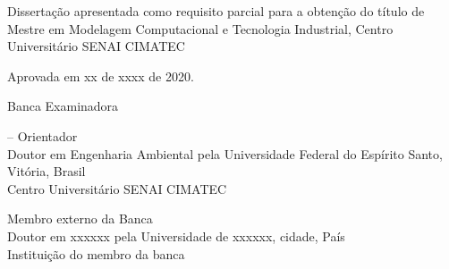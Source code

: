 \begin{folhadeaprovacao}

  \begin{center}
    {\ABNTEXchapterfont\large\imprimirautor}

    \vspace*{\fill}\vspace*{\fill}
    \begin{center}
      \ABNTEXchapterfont\large\imprimirtitulo
    \end{center}
    \vspace*{\fill}
    
    \hspace{\textwidth}
    \begin{minipage}{\textwidth}
       Dissertação apresentada como requisito parcial para a obtenção do título de Mestre em Modelagem Computacional e Tecnologia Industrial, Centro Universitário SENAI CIMATEC
    \end{minipage}%
    \vspace*{\fill}
   \end{center}
   
        
   \begin{flushright}
    Aprovada em xx de xxxx de 2020.
   \end{flushright}
   
   \hfill \break
   \hfill \break
   
   \centering
   
   Banca Examinadora
   
    
   \begin{flushleft}
    \imprimirorientador\hspace{1.5mm}-- Orientador \hrulefill \\
    Doutor em Engenharia Ambiental pela Universidade Federal do Espírito Santo, Vitória, Brasil \\
    Centro Universitário SENAI CIMATEC
   \end{flushleft}
   
   \hfill
   
   \begin{flushleft}
    Membro externo da Banca \hrulefill \\
    Doutor em xxxxxx pela Universidade de xxxxxx, cidade, País \\
    Instituição do membro da banca
   \end{flushleft}
   

\end{folhadeaprovacao}
